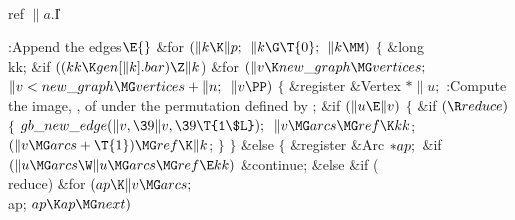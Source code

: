 \Y\B\4\D\\{ref}\5
$\|a.{}$\|I\par
\Y\B\4:Append the edges\X${}\E{}$\6
\&{for} ${}(\|k\K\|p;{}$ ${}\|k\G\T{0};{}$ ${}\|k\MM){}$\5
${}\{{}$\5
\1\&{long} \\{kk};\7
\&{if} ${}((\\{kk}\K\\{gen}[\|k].\\{bar})\Z\|k{}$)\1\6
\&{for} ${}(\|v\K\\{new\_graph}\MG\\{vertices};{}$ ${}\|v<\\{new\_graph}\MG%
\\{vertices}+\|n;{}$ ${}\|v\PP){}$\5
${}\{{}$\1\6
\&{register} \&{Vertex} ${}{*}\|u;{}$\7
:Compute the image, , of  under the permutation defined by %
\X;\6
\&{if} ${}(\|u\E\|v){}$\5
${}\{{}$\1\6
\&{if} ${}(\R\\{reduce}){}$\5
${}\{{}$\1\6
${}\\{gb\_new\_edge}(\|v,\39\|v,\39\T{1\$L});{}$\6
${}\|v\MG\\{arcs}\MG\\{ref}\K\\{kk}{}$;\5
${}(\|v\MG\\{arcs}+\T{1})\MG\\{ref}\K\|k{}$;\6
\4${}\}{}$\2\6
\4${}\}{}$\5
\2\&{else}\5
${}\{{}$\5
\1\&{register} \&{Arc} ${}{*}\\{ap};{}$\7
\&{if} ${}(\|u\MG\\{arcs}\W\|u\MG\\{arcs}\MG\\{ref}\E\\{kk}){}$\1\5
\&{continue};\2\6
\&{else} \&{if} (\\{reduce})\1\6
\&{for} ${}(\\{ap}\K\|v\MG\\{arcs};{}$ \\{ap}; ${}\\{ap}\K\\{ap}\MG\\{next}){}$%
